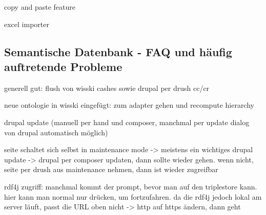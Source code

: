 copy and paste feature

excel importer

\subsection{Semantische Datenbank - FAQ und häufig auftretende Probleme}\label{sec:faqSW}

generell gut: flush von wisski cashes sowie drupal per drush cc/cr

neue ontologie in wisski eingefügt: zum adapter gehen und recompute hierarchy

drupal update (manuell per hand und composer, manchmal per update dialog von drupal automatisch möglich)

seite schaltet sich selbst in maintenance mode -> meistens ein wichtiges drupal update -> drupal per composer updaten, dann sollte wieder gehen. wenn nicht, seite per drush aus maintenance nehmen, dann ist wieder zugreifbar

rdf4j zugriff: manchmal kommt der  prompt, bevor man auf den triplestore kann. hier kann man normal nur  drücken, um fortzufahren. da die rdf4j jedoch lokal am server läuft, passt die URL oben nicht -> http auf https ändern, dann geht









